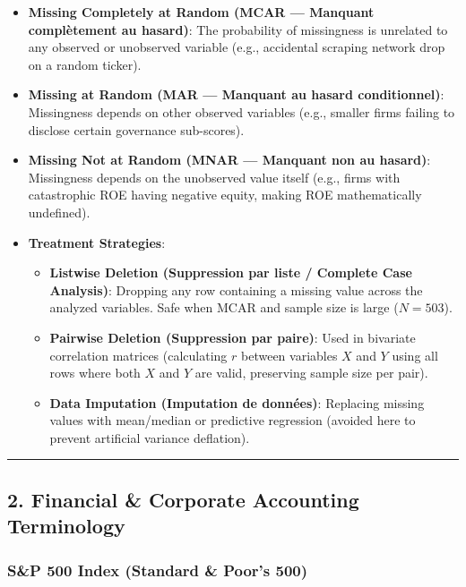 \documentclass[
]{article}
\providecommand{\tightlist}{%
  \setlength{\itemsep}{0pt}\setlength{\parskip}{0pt}}
\begin{document}
\begin{itemize}
\tightlist
\item
  \textbf{Missing Completely at Random (MCAR --- Manquant complètement
  au hasard)}: The probability of missingness is unrelated to any
  observed or unobserved variable (e.g., accidental scraping network
  drop on a random ticker).
\item
  \textbf{Missing at Random (MAR --- Manquant au hasard conditionnel)}:
  Missingness depends on other observed variables (e.g., smaller firms
  failing to disclose certain governance sub-scores).
\item
  \textbf{Missing Not at Random (MNAR --- Manquant non au hasard)}:
  Missingness depends on the unobserved value itself (e.g., firms with
  catastrophic ROE having negative equity, making ROE mathematically
  undefined).
\item
  \textbf{Treatment Strategies}:

  \begin{itemize}
  \tightlist
  \item
    \textbf{Listwise Deletion (Suppression par liste / Complete Case
    Analysis)}: Dropping any row containing a missing value across the
    analyzed variables. Safe when MCAR and sample size is large
    (\(N = 503\)).
  \item
    \textbf{Pairwise Deletion (Suppression par paire)}: Used in
    bivariate correlation matrices (calculating \(r\) between variables
    \(X\) and \(Y\) using all rows where both \(X\) and \(Y\) are valid,
    preserving sample size per pair).
  \item
    \textbf{Data Imputation (Imputation de données)}: Replacing missing
    values with mean/median or predictive regression (avoided here to
    prevent artificial variance deflation).
  \end{itemize}
\end{itemize}

\begin{center}\rule{0.5\linewidth}{0.5pt}\end{center}

\subsection{2. Financial \& Corporate Accounting
Terminology}\label{financial-corporate-accounting-terminology}

\subsubsection{S\&P 500 Index (Standard \& Poor's
500)}\label{sp-500-index-standard-poors-500}
\end{document}
